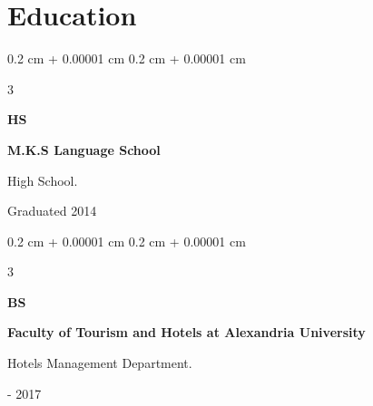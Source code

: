 \documentclass[10pt, letterpaper]{article}
\newenvironment{highlights}{
    \begin{itemize}[
        topsep=0.10 cm,
        parsep=0.10 cm,
        partopsep=0pt,
        itemsep=0pt,
        leftmargin=0.4 cm + 10pt
    ]
}{
    \end{itemize}
} %
\newenvironment{highlightsforbulletentries}{
    \begin{itemize}[
        topsep=0.10 cm,
        parsep=0.10 cm,
        partopsep=0pt,
        itemsep=0pt,
        leftmargin=10pt
    ]
}{
    \end{itemize}
} %
\newenvironment{onecolentry}{
    \begin{adjustwidth}{
        0.2 cm + 0.00001 cm
    }{
        0.2 cm + 0.00001 cm
    }
}{
    \end{adjustwidth}
} %
\newenvironment{threecolentry}[3][]{
    \onecolentry
    \def\thirdColumn{#3}
    \setcolumnwidth{1 cm, \fill, 4.5 cm}
    \begin{paracol}{3}
    {\raggedright #2} \switchcolumn
}{
    \switchcolumn \raggedleft \thirdColumn
    \end{paracol}
    \endonecolentry
} %
\let\hrefWithoutArrow\href
\renewcommand{\href}[2]{\hrefWithoutArrow{#1}{\ifthenelse{\equal{#2}{}}{ }{#2 }\raisebox{.15ex}{\footnotesize \faExternalLink*}}}
\begin{document}
        \vspace{0.2 cm}



    









    \section{Education}
        \begin{threecolentry}{\textbf{HS}}{
            Graduated 2014
        }
            \item \textbf{M.K.S Language School} 
            \item High School.

        \end{threecolentry}


        \begin{threecolentry}{\textbf{BS}}{
            2014 - 2017
        }
            \item \textbf{Faculty of Tourism and Hotels at Alexandria University}
            \item Hotels Management Department.
        \end{threecolentry}
\end{document}
